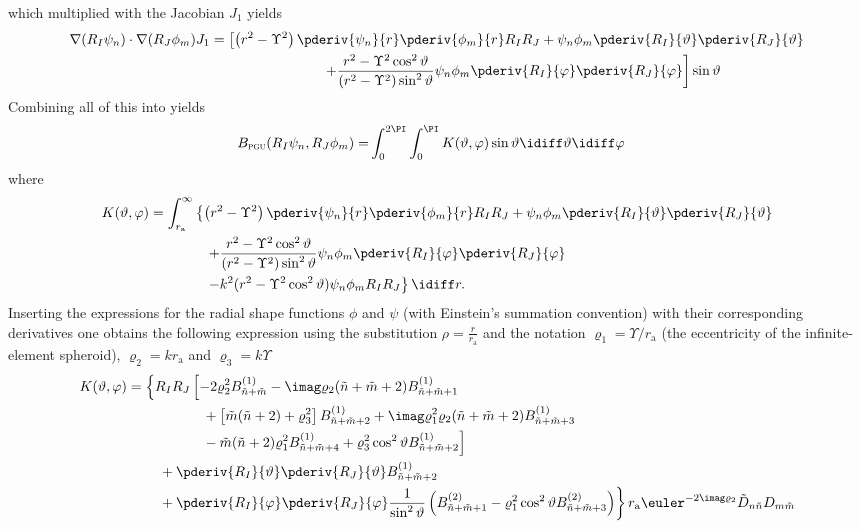 which multiplied with the Jacobian $J_1$ yields
\begin{align*}
	\nabla(R_I\psi_n)\cdot \nabla (R_J\phi_m) J_1&= \left[\left(r^2-\Upsilon^2\right)\pderiv{\psi_n}{r}\pderiv{\phi_m}{r}R_IR_J + \psi_n\phi_m\pderiv{R_I}{\vartheta}\pderiv{R_J}{\vartheta}\right. \\
	 &{\hskip8em\relax}\left.+ \frac{r^2-\Upsilon^2\cos^2\vartheta}{(r^2-\Upsilon^2)\sin^2\vartheta}\psi_n\phi_m\pderiv{R_I}{\varphi}\pderiv{R_J}{\varphi}\right]\sin\vartheta
\end{align*}
Combining all of this into  yields
\begin{align}
	B_{\textsc{pgu}}(R_I\psi_n,R_J\phi_m) = &\int_0^{2\PI}\int_0^\PI K(\vartheta,\varphi)\sin\vartheta\idiff\vartheta\idiff\varphi
\end{align}
where
\begin{align*}
	K(\vartheta,\varphi) &= \int_{r_{\mathrm{a}}}^{\infty} \left\{\left(r^2-\Upsilon^2\right)\pderiv{\psi_n}{r}\pderiv{\phi_m}{r}R_IR_J + \psi_n\phi_m\pderiv{R_I}{\vartheta}\pderiv{R_J}{\vartheta}\right. \\
	 &{\hskip4em\relax}\left.+ \frac{r^2-\Upsilon^2\cos^2\vartheta}{(r^2-\Upsilon^2)\sin^2\vartheta}\psi_n\phi_m\pderiv{R_I}{\varphi}\pderiv{R_J}{\varphi}\right.\\
	 &{\hskip4em\relax}\left.-k^2(r^2-\Upsilon^2\cos^2\vartheta)\psi_n\phi_m R_I R_J\right\}\idiff r.
\end{align*}
Inserting the expressions for the radial shape functions $\phi$ and $\psi$ (with Einstein's summation convention) with their corresponding derivatives one obtains the following expression using the substitution $\rho = \frac{r}{r_{\mathrm{a}}}$ and the notation $\varrho_1 = \Upsilon/r_{\mathrm{a}}$ (the eccentricity of the infinite-element spheroid), $\varrho_2=kr_{\mathrm{a}}$ and $\varrho_3=k\Upsilon$
\begin{align*} 
	 K(\vartheta,\varphi) &= \left\{R_IR_J\left[-2\varrho_2^2B_{\tilde{n}+\tilde{m}}^{(1)} - \imag \varrho_2(\tilde{n}+\tilde{m}+2)B_{\tilde{n}+\tilde{m}+1}^{(1)} \phantom{\left(\pderiv{r_{\mathrm{a}}}{\varphi}\right)^2} \right.\right.\\
	 &\left.\left.{\hskip5em\relax} + \left[\tilde{m}(\tilde{n}+2) +\varrho_3^2\right]B_{\tilde{n}+\tilde{m}+2}^{(1)}+ \imag \varrho_1^2\varrho_2(\tilde{n}+\tilde{m}+2)B_{\tilde{n}+\tilde{m}+3}^{(1)}\right.\right.\\
	 &\left.\left.{\hskip5em\relax}  - \tilde{m}(\tilde{n}+2)\varrho_1^2 B_{\tilde{n}+\tilde{m}+4}^{(1)}+\varrho_3^2\cos^2\vartheta B_{\tilde{n}+\tilde{m}+2}^{(1)}\right] \right.\\
	 &\left.{\hskip2em\relax}+ \pderiv{R_I}{\vartheta}\pderiv{R_J}{\vartheta}B_{\tilde{n}+\tilde{m}+2}^{(1)}\right.\\
	 &\left.{\hskip2em\relax}+\pderiv{R_I}{\varphi}\pderiv{R_J}{\varphi}\frac{1}{\sin^2\vartheta}\left(B_{\tilde{n}+\tilde{m}+1}^{(2)} - \varrho_1^2\cos^2\vartheta B_{\tilde{n}+\tilde{m}+3}^{(2)}\right)\right\}r_{\mathrm{a}}\euler^{-2\imag \varrho_2}\tilde{D}_{n\tilde{n}}D_{m\tilde{m}}
\end{align*}
